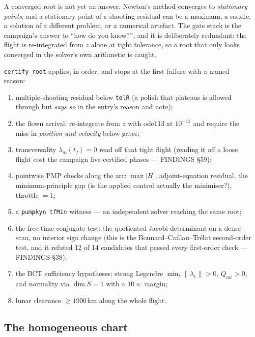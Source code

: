 \documentclass[11pt]{article}
\newcommand{\lv}{\lambda_v}\newcommand{\lr}{\lambda_r}\newcommand{\lm}{\lambda_m}
\newcommand{\tf}{t_f}\newcommand{\R}{\mathbb{R}}
\newcommand{\file}[1]{\texttt{#1}}
\begin{document}
\begin{intu}
A converged root is not yet an answer. Newton's method converges to
\emph{stationary points}, and a stationary point of a shooting residual can
be a maximum, a saddle, a solution of a different problem, or a numerical
artefact. The gate stack is the campaign's answer to ``how do you know?'',
and it is deliberately redundant: the flight is re-integrated from $z$ alone
at tight tolerance, so a root that only looks converged in the solver's own
arithmetic is caught.
\end{intu}

\begin{rig}
\file{certify\_root} applies, in order, and stops at the first failure with a
named reason:
\begin{enumerate}[nosep]
\item multiple-shooting residual below \file{tolR} (a polish that plateaus is
      allowed through but \emph{says so} in the entry's reason and note);
\item the flown arrival: re-integrate from $z$ with ode113 at $10^{-13}$ and
      require the miss in \emph{position and velocity} below gates;
\item transversality $\lm(\tf)=0$ read off that tight flight (reading it off a
      loose flight cost the campaign five certified phases --- FINDINGS §59);
\item pointwise PMP checks along the arc: $\max|H|$, adjoint-equation
      residual, the minimum-principle gap (is the applied control actually
      the minimiser?), throttle $=1$;
\item a \file{pumpkyn tfMin} witness --- an independent solver reaching the
      same root;
\item the free-time conjugate test: the quotiented Jacobi determinant on a
      dense scan, no interior sign change (this is the Bonnard--Caillau--Trélat
      second-order test, and it refuted 12 of 14 candidates that passed every
      first-order check --- FINDINGS §38);
\item the BCT sufficiency hypotheses: strong Legendre $\min_t\|\lv\|>0$,
      $Q_{mt}>0$, and normality via $\dim S = 1$ with a $10\times$ margin;
\item lunar clearance $\ge 1900$\,km along the whole flight.
\end{enumerate}
\end{rig}

\subsection{The homogeneous chart}\label{sec:hom}
\end{document}
